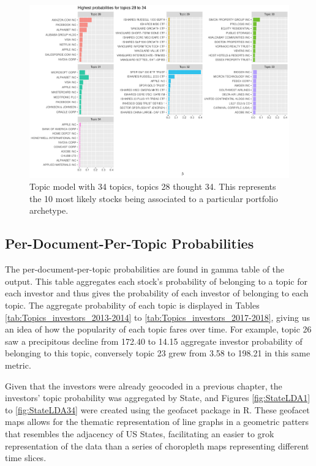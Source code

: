 \begin{figure}
	\centering
	\includegraphics[width=\linewidth]{Figures/ChapterV/LDA34_28_34}
	\caption[Topic Model with 34 Topics, Topics 28 thought 34]{Topic model with 34 topics, topics 28 thought 34. This represents the 10 most likely stocks being associated to a particular portfolio archetype.}
	\label{fig:lda34-28-34}
\end{figure}


\subsection{Per-Document-Per-Topic Probabilities}

The per-document-per-topic probabilities are found in gamma table of the output.  This table aggregates each stock's probability of belonging to a topic for each investor and thus gives the probability of each investor of belonging to each topic.  The aggregate probability of each topic is displayed in Tables \ref{tab:Topics_investors_2013-2014} to \ref{tab:Topics_investors_2017-2018}, giving us an idea of how the popularity of each topic fares over time.  For example, topic 26 saw a precipitous decline from 172.40 to 14.15 aggregate investor probability of belonging to this topic, conversely topic 23 grew from 3.58 to 198.21 in this same metric.  

Given that the investors were already geocoded in a previous chapter, the investors' topic probability was aggregated by State, and Figures \ref{fig:StateLDA1} to \ref{fig:StateLDA34} were created using the geofacet package in R. These geofacet maps allows for the thematic representation of line graphs in a geometric patters that resembles the adjacency of US States, facilitating an easier to grok representation of the data than a series of choropleth maps representing different time slices.  

